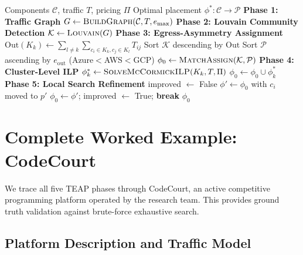 \documentclass[10pt,journal]{IEEEtran}
\begin{document}
\begin{algorithm}[t]
\caption{TEAP: Complete Pseudocode}\label{alg:teap}
\begin{algorithmic}[1]
\Require Components $\mathcal{C}$, traffic $T$, pricing $\Pi$
\Ensure Optimal placement $\phi^*: \mathcal{C}\to\mathcal{P}$
\Statex \textbf{Phase 1: Traffic Graph}
\State $G \leftarrow \textsc{BuildGraph}(\mathcal{C}, T, e_{\max})$
\Statex \textbf{Phase 2: Louvain Community Detection}
\State $\mathcal{K} \leftarrow \textsc{Louvain}(G)$
\Statex \textbf{Phase 3: Egress-Asymmetry Assignment}
  \State $\text{Out}(K_k) \leftarrow \sum_{l\neq k}\sum_{c_i\in K_k, c_j\in K_l} T_{ij}$
\EndFor
\State Sort $\mathcal{K}$ descending by $\text{Out}$
\State Sort $\mathcal{P}$ ascending by $e_{\text{out}}$ (Azure$<$AWS$<$GCP)
\State $\phi_0 \leftarrow \textsc{MatchAssign}(\mathcal{K}, \mathcal{P})$
\Statex \textbf{Phase 4: Cluster-Level ILP}
  \State $\phi_k^* \leftarrow \textsc{SolveMcCormickILP}(K_k, T, \Pi)$
  \State $\phi_0 \leftarrow \phi_0 \cup \phi_k^*$
\EndFor
\Statex \textbf{Phase 5: Local Search Refinement}
\Repeat
  \State improved $\leftarrow$ False
      \State $\phi' \leftarrow \phi_0$ with $c_i$ moved to $p'$
        \State $\phi_0 \leftarrow \phi'$; improved $\leftarrow$ True; \textbf{break}
      \EndIf
    \EndFor
  \EndFor
{}
\Return $\phi_0$
\end{algorithmic}
\end{algorithm}

\section{Complete Worked Example: CodeCourt}\label{sec:worked}

We trace all five TEAP phases through CodeCourt, an active competitive programming
platform operated by the research team.
This provides ground truth validation against brute-force exhaustive search.

\subsection{Platform Description and Traffic Model}
\end{document}
